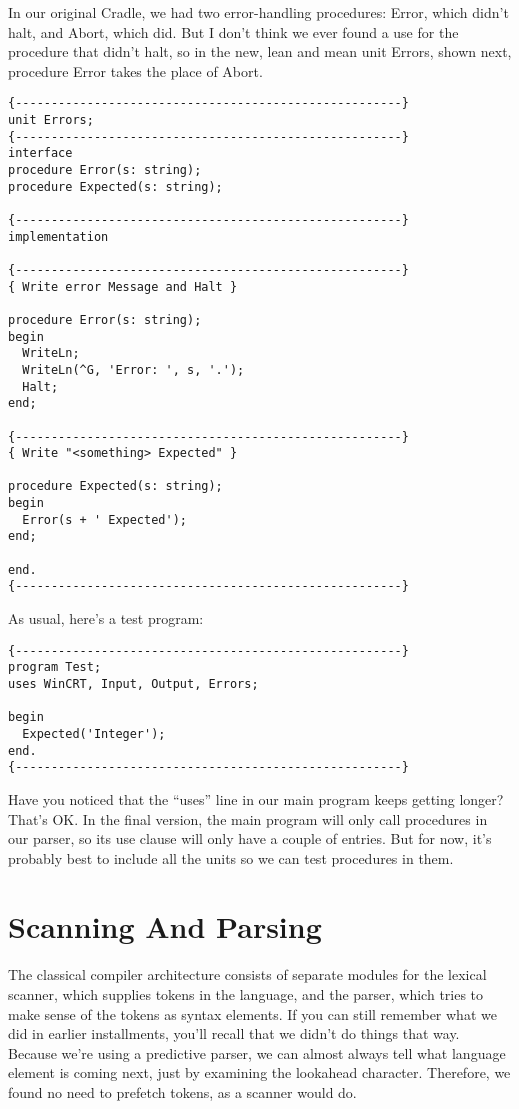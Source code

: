In our original Cradle, we had two error-handling procedures: Error, which didn't halt, and Abort, which did. But I don't think we ever found a use for the procedure that didn't halt, so in the new, lean and mean unit Errors, shown next, procedure Error takes the place of Abort.

\begin{verbatim}
{------------------------------------------------------}
unit Errors;
{------------------------------------------------------}
interface
procedure Error(s: string);
procedure Expected(s: string);

{------------------------------------------------------}
implementation

{------------------------------------------------------}
{ Write error Message and Halt }

procedure Error(s: string);
begin
  WriteLn;
  WriteLn(^G, 'Error: ', s, '.');
  Halt;
end;

{------------------------------------------------------}
{ Write "<something> Expected" }

procedure Expected(s: string);
begin
  Error(s + ' Expected');
end;

end.
{------------------------------------------------------}
\end{verbatim}

As usual, here's a test program:

\begin{verbatim}
{------------------------------------------------------}
program Test;
uses WinCRT, Input, Output, Errors;

begin
  Expected('Integer');
end.
{------------------------------------------------------}
\end{verbatim}

Have you noticed that the ``uses'' line in our main program keeps getting longer?  That's OK. In the final version, the main program will only call procedures in our parser, so its use clause will only have a couple of entries. But for now, it's probably best to include all the units so we can test procedures in them.

\section{Scanning And Parsing}

The classical compiler architecture consists of separate modules for the lexical scanner, which supplies tokens in the language, and the parser, which tries to make sense of the tokens as syntax elements. If you can still remember what we did in earlier installments, you'll recall that we didn't do things that way. Because we're using a predictive parser, we can almost always tell what language element is coming next, just by examining the lookahead character. Therefore, we found no need to prefetch tokens, as a scanner would do.

